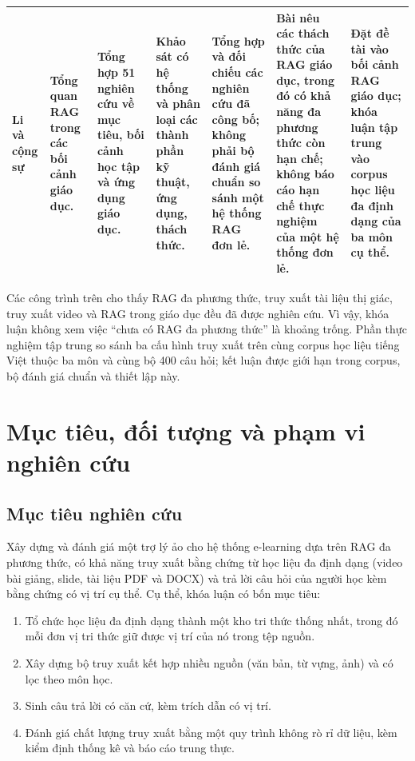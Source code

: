 \begin{landscape}
\begin{longtable}{|p{2.2cm}|p{3.0cm}|p{3.2cm}|p{3.2cm}|p{2.8cm}|p{3.4cm}|p{3.0cm}|}
\hline
Li và cộng sự \cite{li2025ragedu} & Tổng quan RAG trong các bối cảnh giáo dục. & Tổng hợp 51 nghiên cứu về mục tiêu, bối cảnh học tập và ứng dụng giáo dục. & Khảo sát có hệ thống và phân loại các thành phần kỹ thuật, ứng dụng, thách thức. & Tổng hợp và đối chiếu các nghiên cứu đã công bố; không phải bộ đánh giá chuẩn so sánh một hệ thống RAG đơn lẻ. & Bài nêu các thách thức của RAG giáo dục, trong đó có khả năng đa phương thức còn hạn chế; không báo cáo hạn chế thực nghiệm của một hệ thống đơn lẻ. & Đặt đề tài vào bối cảnh RAG giáo dục; khóa luận tập trung vào corpus học liệu đa định dạng của ba môn cụ thể. \\
\hline
\end{longtable}
\end{landscape}

Các công trình trên cho thấy RAG đa phương thức, truy xuất tài liệu thị giác, truy xuất video và RAG trong giáo dục đều đã được nghiên cứu. Vì vậy, khóa luận không xem việc ``chưa có RAG đa phương thức'' là khoảng trống. Phần thực nghiệm tập trung so sánh ba cấu hình truy xuất trên cùng corpus học liệu tiếng Việt thuộc ba môn và cùng bộ 400 câu hỏi; kết luận được giới hạn trong corpus, bộ đánh giá chuẩn và thiết lập này.


\section{Mục tiêu, đối tượng và phạm vi nghiên cứu}

\subsection{Mục tiêu nghiên cứu}\label{sec:muc-tieu}

Xây dựng và đánh giá một trợ lý ảo cho hệ thống e-learning dựa trên RAG đa phương thức, có khả năng truy xuất bằng chứng từ học liệu đa định dạng (video bài giảng, slide, tài liệu PDF và DOCX) và trả lời câu hỏi của người học kèm bằng chứng có vị trí cụ thể. Cụ thể, khóa luận có bốn mục tiêu:
\begin{enumerate}
    \item Tổ chức học liệu đa định dạng thành một kho tri thức thống nhất, trong đó mỗi đơn vị tri thức giữ được vị trí của nó trong tệp nguồn.
    \item Xây dựng bộ truy xuất kết hợp nhiều nguồn (văn bản, từ vựng, ảnh) và có lọc theo môn học.
    \item Sinh câu trả lời có căn cứ, kèm trích dẫn có vị trí.
    \item Đánh giá chất lượng truy xuất bằng một quy trình không rò rỉ dữ liệu, kèm kiểm định thống kê và báo cáo trung thực.
\end{enumerate}

